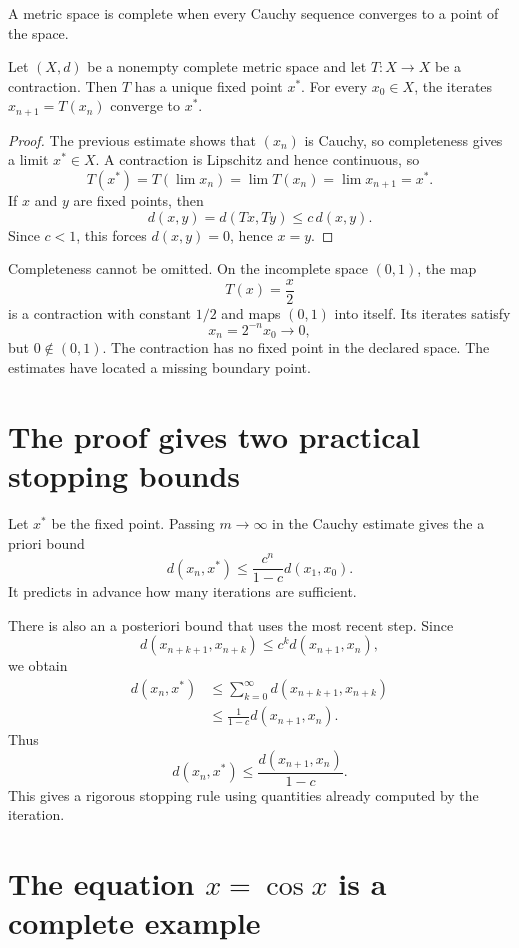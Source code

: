 A metric space is complete when every Cauchy sequence converges to a point of the space.

\begin{theorem}
Let \((X,d)\) be a nonempty complete metric space and let \(T:X\to X\) be a contraction.  Then \(T\) has a unique fixed point \(x^*\).  For every \(x_0\in X\), the iterates \(x_{n+1}=T(x_n)\) converge to \(x^*\).
\end{theorem}

\begin{proof}
The previous estimate shows that \((x_n)\) is Cauchy, so completeness gives a limit \(x^*\in X\).  A contraction is Lipschitz and hence continuous, so
\[
  T(x^*)
  =T\left(\lim x_n\right)
  =\lim T(x_n)
  =\lim x_{n+1}
  =x^*.
\]
If \(x\) and \(y\) are fixed points, then
\[
  d(x,y)=d(Tx,Ty)\le c\,d(x,y).
\]
Since \(c<1\), this forces \(d(x,y)=0\), hence \(x=y\).
\end{proof}

Completeness cannot be omitted.  On the incomplete space \((0,1)\), the map
\[
  T(x)=\frac{x}{2}
\]
is a contraction with constant \(1/2\) and maps \((0,1)\) into itself.  Its iterates satisfy
\[
  x_n=2^{-n}x_0\longrightarrow0,
\]
but \(0\notin(0,1)\).  The contraction has no fixed point in the declared space.  The estimates have located a missing boundary point.

\section{The proof gives two practical stopping bounds}

Let \(x^*\) be the fixed point.  Passing \(m\to\infty\) in the Cauchy estimate gives the a priori bound
\[
  \boxed{
  d(x_n,x^*)
  \le\frac{c^n}{1-c}d(x_1,x_0).}
\]
It predicts in advance how many iterations are sufficient.

There is also an a posteriori bound that uses the most recent step.  Since
\[
  d(x_{n+k+1},x_{n+k})
  \le c^k d(x_{n+1},x_n),
\]
we obtain
\[
\begin{aligned}
  d(x_n,x^*)
  &\le\sum_{k=0}^{\infty}d(x_{n+k+1},x_{n+k})\\
  &\le\frac{1}{1-c}d(x_{n+1},x_n).
\end{aligned}
\]
Thus
\[
  \boxed{
  d(x_n,x^*)
  \le\frac{d(x_{n+1},x_n)}{1-c}.}
\]
This gives a rigorous stopping rule using quantities already computed by the iteration.

\section{The equation \texorpdfstring{$x=\cos x$}{x=cos x} is a complete example}

